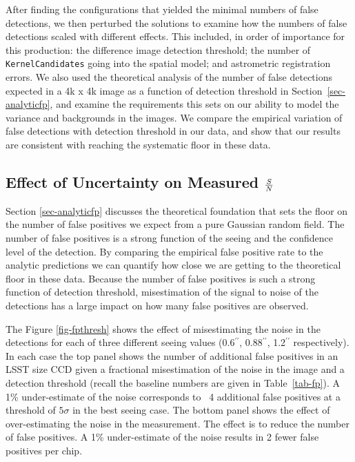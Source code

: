 \documentclass[prd, nofootinbib, floatfix, 11pt,tightenlines,times]{article}
\begin{document}
After finding the configurations that yielded the minimal numbers of
false detections, we then perturbed the solutions to examine how the
numbers of false detections scaled with different effects.  This
included, in order of importance for this production: the difference
image detection threshold; the number of {\tt KernelCandidates} going
into the spatial model; and astrometric registration errors.  We also
used the theoretical analysis of the number of false detections
expected in a 4k x 4k image as a function of detection threshold in
Section~\ref{sec-analyticfp}, and examine the requirements this sets
on our ability to model the variance and backgrounds in the images.
We compare the empirical variation of false detections with detection
threshold in our data, and show that our results are consistent with
reaching the systematic floor in these data.

\subsection{Effect of Uncertainty on Measured ${S}\over{N}$ \label{sec-sn}}

Section \ref{sec-analyticfp} discusses the theoretical foundation 
that sets the floor on the number of false positives we expect from a 
pure Gaussian random field.  The number of false positives is a strong
function of the seeing and the confidence level of the detection.  
By comparing the empirical false positive rate to the analytic predictions
we can quantify how close we are getting to the theoretical floor in these
data.  Because the number of false positives is such a strong function of
detection threshold, misestimation of the signal to noise of the detections
has a large impact on how many false positives are observed.  

The Figure \ref{fig-fpthresh} shows the 
effect of misestimating the noise in the detections for each of three different
seeing values (0.6$^{\prime\prime}$, 0.88$^{\prime\prime}$, 1.2$^{\prime\prime}$ respectively).  In each case the top panel shows
the number of additional false positives in an LSST size CCD given a fractional misestimation
of the noise in the image and a detection threshold (recall the baseline numbers are given in 
Table~\ref{tab-fp}).  A 1\% under-estimate of the noise
corresponds to ~4 additional false positives at a threshold of $5\sigma$ in the best seeing case.  
The bottom panel shows 
the effect of over-estimating the noise in the measurement.  The effect is to reduce
the number of false positives.  A 1\% under-estimate of the noise results in 2 fewer false positives
per chip.
\end{document}

